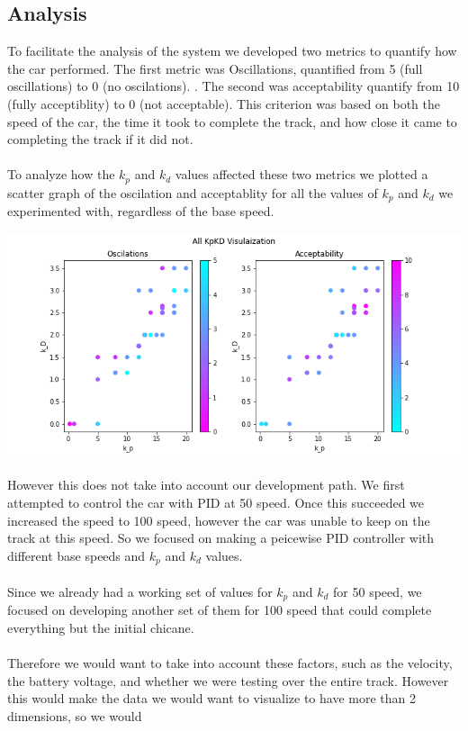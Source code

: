 \documentclass[12pt]{article}
\begin{document}
\begin{multicols}{2}
\section*{Analysis}
To facilitate the analysis of the system we developed two metrics to quantify how
the car performed. The first metric was Oscillations, quantified from 5 (full oscillations) to 0 (no oscilations).
. The second was acceptability quantify from 10 (fully acceptiblity) to 0 (not acceptable). This criterion was
based on both the speed of the car, the time it took to complete the track, and how close it came to 
completing the track if it did not. \\\\
To analyze how the $k_p$ and $k_d$ values affected these two metrics we plotted a scatter graph of the oscilation and acceptablity
for all the values of $k_p$ and $k_d$ we experimented with, regardless of the base speed.
\begin{center}
\includegraphics*[scale=0.3]{KpKiAll.png}
\end{center}
However this does not take into account our development path. 
We first attempted to control the car with PID at 50 speed. Once this succeeded we increased the speed to 
100 speed, however the car was unable to keep on the track at this speed. So we focused on making a peicewise PID controller with different base speeds and 
$k_p$ and $k_d$ values.\\\\
 Since we already had a working set of values for $k_p$ and $k_d$ for 50 speed, we focused on developing another set of
them for 100 speed that could complete everything but the initial chicane. \\\\
Therefore we would want to take into account these factors, such as the velocity, the battery voltage, and whether we were testing over the 
entire track. However this would make the data we would want to visualize to have more than 2 dimensions, so we would

\end{multicols}
\end{document}
